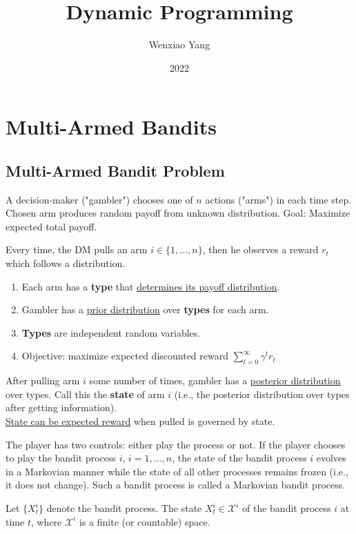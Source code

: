 \documentclass[11pt]{elegantbook}
\title{\textbf{Dynamic Programming}}
\author{Wenxiao Yang}
\institute{Department of Mathematics, University of Illinois at Urbana-Champaign}
\date{2022}
\begin{document}
\maketitle
\frontmatter
\tableofcontents
\mainmatter


\chapter{Multi-Armed Bandits}
\section{Multi-Armed Bandit Problem}
\begin{definition}
    A decision-maker ("gambler") chooses one of $n$ actions ("arms") in each time step. Chosen arm produces random payoff from unknown distribution. Goal: Maximize expected total payoff.
\end{definition}

Every time, the DM pulls an arm $i\in\{1,...,n\}$, then he observes a reward $r_t$ which follows a distribution.
\begin{enumerate}[$\bullet$]
    \item Each arm has a \textbf{type} that \underline{determines its payoff distribution}.
    \item Gambler has a \underline{prior distribution} over \textbf{types} for each arm.
    \item \textbf{Types} are independent random variables.
    \item Objective: maximize expected discounted reward $\sum_{t=0}^\infty \gamma^t r_t$
\end{enumerate}
\begin{definition}[State]
    After pulling arm $i$ some number of times, gambler has a \underline{posterior distribution} over types. Call this the \textbf{state} of arm $i$ (i.e., the posterior distribution over types after getting information).\\
    \underline{State can be expected reward} when pulled is governed by state.
\end{definition}
The player has two controls: either play the process or not. If the player chooses to play the bandit process $i$, $i = 1,...,n$, the state of the bandit process $i$ evolves in a Markovian manner while the state of all other processes remains frozen (i.e., it does not change). Such a bandit process is called a Markovian bandit process.

Let $\{X_t^i\}$ denote the bandit process. The state $X_t^i\in \mathcal{X}^i$ of the bandit process $i$ at time $t$, where $\mathcal{X}^i$ is a finite (or countable) space.
\end{document}

